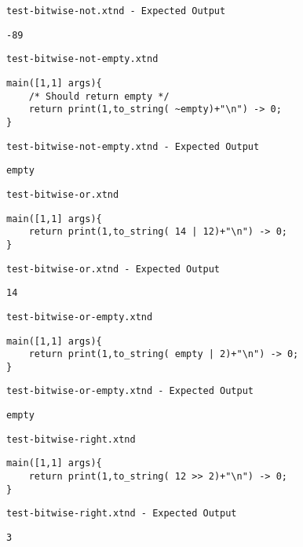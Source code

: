 \medskip \noindent \texttt{test-bitwise-not.xtnd - Expected Output}


\begin{lstlisting}
-89
\end{lstlisting}


\medskip \noindent \texttt{test-bitwise-not-empty.xtnd}


\begin{lstlisting}
main([1,1] args){
	/* Should return empty */
	return print(1,to_string( ~empty)+"\n") -> 0;
}
\end{lstlisting}


\medskip \noindent \texttt{test-bitwise-not-empty.xtnd - Expected Output}


\begin{lstlisting}
empty
\end{lstlisting}


\medskip \noindent \texttt{test-bitwise-or.xtnd}


\begin{lstlisting}
main([1,1] args){
	return print(1,to_string( 14 | 12)+"\n") -> 0;
}
\end{lstlisting}


\medskip \noindent \texttt{test-bitwise-or.xtnd - Expected Output}


\begin{lstlisting}
14
\end{lstlisting}


\medskip \noindent \texttt{test-bitwise-or-empty.xtnd}


\begin{lstlisting}
main([1,1] args){
	return print(1,to_string( empty | 2)+"\n") -> 0;
}
\end{lstlisting}


\medskip \noindent \texttt{test-bitwise-or-empty.xtnd - Expected Output}


\begin{lstlisting}
empty
\end{lstlisting}


\medskip \noindent \texttt{test-bitwise-right.xtnd}


\begin{lstlisting}
main([1,1] args){
	return print(1,to_string( 12 >> 2)+"\n") -> 0;
}
\end{lstlisting}


\medskip \noindent \texttt{test-bitwise-right.xtnd - Expected Output}


\begin{lstlisting}
3
\end{lstlisting}


